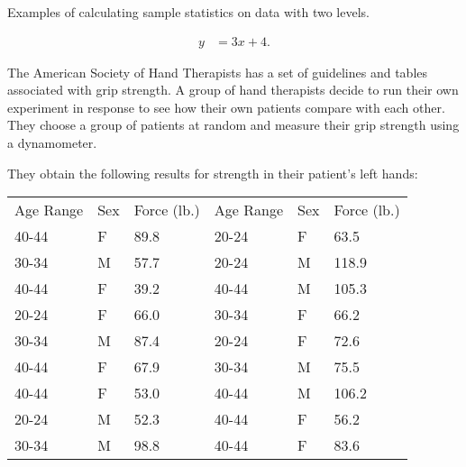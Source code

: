 


\begin{problem}
\item Examples of calculating sample statistics on data with two levels.

  \begin{subproblem}
  \item 
    \begin{eqnarray}
      y & = 3x + 4.
    \end{eqnarray}
    \vfill
  \end{subproblem}


\end{problem}




The American Society of Hand Therapists has a set of guidelines and
tables associated with grip strength. A group of hand therapists
decide to run their own experiment in response to see how their own
patients compare with each other. They choose a group of patients at
random and measure their grip strength using a dynamometer.

They obtain the following results for strength in their patient's
left hands: \\
\begin{tabular}{lll@{\hspace{4em}}lll}
Age Range & Sex & Force (lb.) & Age Range & Sex & Force (lb.) \\
40-44 & F & 89.8 & 20-24 & F & 63.5 \\
30-34 & M & 57.7 & 20-24 & M & 118.9 \\
40-44 & F & 39.2 & 40-44 & M & 105.3 \\
20-24 & F & 66.0 & 30-34 & F & 66.2 \\
30-34 & M & 87.4 & 20-24 & F & 72.6 \\
40-44 & F & 67.9 & 30-34 & M & 75.5 \\
40-44 & F & 53.0 & 40-44 & M & 106.2 \\
20-24 & M & 52.3 & 40-44 & F & 56.2 \\
30-34 & M & 98.8 & 40-44 & F & 83.6
\end{tabular}

